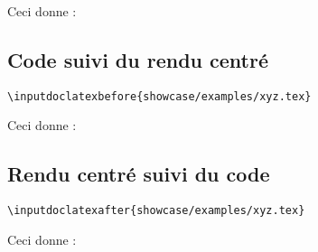 Ceci donne :





\subsection{Code suivi du rendu centré}

\begin{tcolorbox}  %
\begin{verbatim}
\inputdoclatexbefore{showcase/examples/xyz.tex}
\end{verbatim}
\end{tcolorbox}    %

Ceci donne :





\subsection{Rendu centré suivi du code}

\begin{tcolorbox}  %
\begin{verbatim}
\inputdoclatexafter{showcase/examples/xyz.tex}
\end{verbatim}
\end{tcolorbox}    %

Ceci donne :

